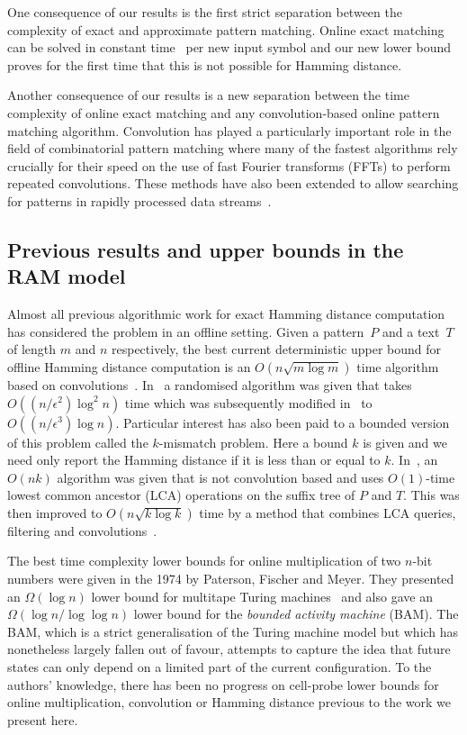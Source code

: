 \documentclass{toc}
\begin{document}
One consequence of our results is the first strict separation between the complexity of exact and approximate pattern matching.  Online exact matching can be solved in constant time~\cite{Galil:1981} per new input symbol and our new lower bound proves for the first time that this is not possible for Hamming distance.

%

Another consequence of our results is a new separation between the time complexity of online exact matching and any convolution-based online pattern matching algorithm. Convolution has played a particularly important role in the field of combinatorial pattern matching where many of the fastest algorithms rely crucially for their speed on the use of fast Fourier transforms (FFTs) to perform repeated convolutions. These methods have also been extended to allow searching for patterns in rapidly processed data streams~\cite{CEPP:2011,CS:2011}.


\subsection{Previous results and upper bounds in the RAM model} \label{sec:previous}

Almost all previous algorithmic work for exact Hamming distance computation has considered the problem in an offline setting.  Given a pattern~$P$ and a text~$T$ of length $m$ and $n$ respectively, the best current deterministic upper bound for offline Hamming distance computation is an $O(n\sqrt{m\log{m}})$ time algorithm based on convolutions~\cite{Abrahamson:1987, Kosaraju:1987}. In~\cite{Karloff:1993} a randomised algorithm was given that takes $O((n/{\epsilon}^2)\log^2{n})$ time which was subsequently modified in~\cite{Indyk:1998} to $O((n/{{\epsilon}^3}) \log{n})$. Particular interest has also been paid to a bounded version of this problem called the $k$-mismatch problem.  Here a bound $k$ is given and we need only report the Hamming distance if it is less than or equal to $k$. In~\cite{LV:1986a}, an $O(nk)$ algorithm was given that is not convolution based and uses
%
$O(1)$-time  %
lowest common ancestor (LCA) operations on the suffix tree of $P$ and $T$. This was then  improved to $O(n\sqrt{k\log{k}})$ time by a method that combines LCA queries, filtering and convolutions~\cite{ALP:2004}.

The best time complexity lower bounds for online multiplication of two $n$-bit numbers were given in the 1974 by Paterson, Fischer and Meyer.  They presented an $\Omega(\log{n})$ lower bound for multitape Turing machines~\cite{PFM:1974} and also gave an $\Omega(\log{n}/\log{\log n})$ lower bound for the \emph{bounded activity machine} (BAM).  The BAM, which is a strict generalisation of the Turing machine model but which has nonetheless largely fallen out of favour, attempts to capture the idea that future states can only depend on a limited part of the current configuration.  To the authors' knowledge, there has been no progress on cell-probe lower bounds for online multiplication, convolution or Hamming distance previous to the work we present here.
\end{document}
